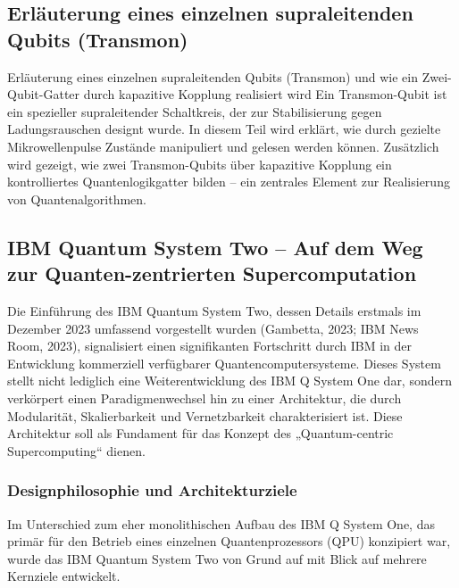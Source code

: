 \subsection{Erläuterung eines einzelnen supraleitenden Qubits (Transmon)}
Erläuterung eines einzelnen supraleitenden Qubits (Transmon) und wie ein Zwei-Qubit-Gatter durch kapazitive Kopplung realisiert wird
Ein Transmon-Qubit ist ein spezieller supraleitender Schaltkreis, der zur Stabilisierung gegen Ladungsrauschen designt wurde. In diesem Teil wird erklärt, wie durch gezielte Mikrowellenpulse Zustände manipuliert und gelesen werden können. Zusätzlich wird gezeigt, wie zwei Transmon-Qubits über kapazitive Kopplung ein kontrolliertes Quantenlogikgatter bilden – ein zentrales Element zur Realisierung von Quantenalgorithmen.

\subsection{IBM Quantum System Two – Auf dem Weg zur Quanten-zentrierten Supercomputation}
Die Einführung des IBM Quantum System Two, dessen Details erstmals im Dezember 2023 umfassend vorgestellt wurden (Gambetta, 2023; IBM News Room, 2023), signalisiert einen signifikanten Fortschritt durch IBM in der Entwicklung kommerziell verfügbarer Quantencomputersysteme. Dieses System stellt nicht lediglich eine Weiterentwicklung des IBM Q System One dar, sondern verkörpert einen Paradigmenwechsel hin zu einer Architektur, die durch Modularität, Skalierbarkeit und Vernetzbarkeit charakterisiert ist. Diese Architektur soll als Fundament für das Konzept des „Quantum-centric Supercomputing“ dienen.

\subsubsection{Designphilosophie und Architekturziele}
Im Unterschied zum eher monolithischen Aufbau des IBM Q System One, das primär für den Betrieb eines einzelnen Quantenprozessors (QPU) konzipiert war, wurde das IBM Quantum System Two von Grund auf mit Blick auf mehrere Kernziele entwickelt. 

